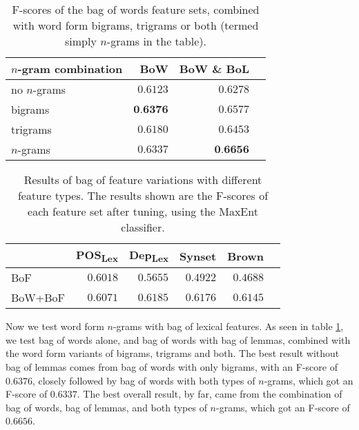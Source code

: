 \documentclass[11pt,letterpaper]{article}
\begin{document}
\begin{table}
  \begin{center}
    \begin{tabular}{lrrr}
      \toprule
      
      $n$-gram combination & BoW & BoW \& BoL \\
      \midrule
      no $n$-grams & $0.6123$ & $0.6278$ \\
      bigrams & $\textbf{0.6376}$ & $0.6577$ \\
      trigrams & $0.6180$ & $0.6453$ \\
      $n$-grams & $0.6337$ & $\textbf{0.6656}$ \\
      \bottomrule

    \end{tabular}
  \end{center}
  \caption{F-scores of the bag of words feature sets, combined with word form bigrams, trigrams or both (termed simply $n$-grams in the table).}
  \label{tab:ngrams}
\end{table}

\begin{table}
  \begin{center}
    \begin{tabular}{lrrrrr}
      \toprule
      
     & POS\textsubscript{Lex} & Dep\textsubscript{Lex} & Synset & Brown\\ %
      \midrule
      BoF & $0.6018$ & $0.5655$ & $0.4922$ & $0.4688$ \\ %
      BoW+BoF & $0.6071$ & $0.6185$ & $0.6176$ & $0.6145$\\ %
      
      \bottomrule

    \end{tabular}
  \end{center}
  \caption{Results of bag of feature variations with different feature types. The results shown are the F-scores of each feature set after tuning, using the MaxEnt classifier.}
  \label{tab:bagOfFeatures}
\end{table}



Now we test word form $n$-grams with bag of lexical features. As seen in table \ref{tab:ngrams}, we test bag of words alone, and bag of words with bag of lemmas, combined with the word form variants of bigrams, trigrams and both. The best result without bag of lemmas comes from bag of words with only bigrams, with an F-score of $0.6376$, closely followed by bag of words with both types of $n$-grams, which got an F-score of $0.6337$. The best overall result, by far, came from the combination of bag of words, bag of lemmas, and both types of $n$-grams, which got an F-score of $0.6656$.
\end{document}
